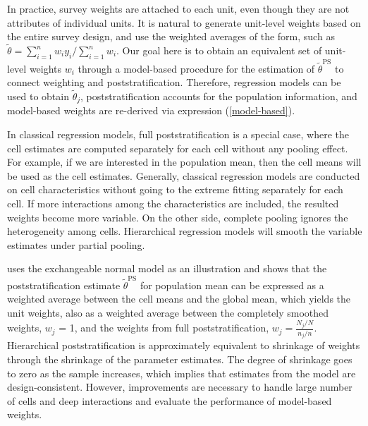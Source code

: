 \documentclass[11pt]{article}
\begin{document}
In practice, survey weights are attached to each unit, even though they are not attributes of individual units. It is natural to generate unit-level weights based on the entire survey design, and use the weighted averages of the form, such as $\tilde{\theta}=\sum_{i=1}^n w_i y_i/\sum_{i=1}^nw_i$. Our goal here is to obtain an equivalent set of unit-level weights $w_i$ through a model-based procedure for the estimation of $\tilde{\theta}^{\textrm{PS}}$ to connect weighting and poststratification. Therefore, regression models can be used to obtain $\tilde{\theta}_j$, poststratification accounts for the population information, and model-based weights are re-derived via expression (\ref{model-based}).
	
In classical regression models, full poststratification is a special case, where the cell estimates are computed separately for each cell without any pooling effect. For example, if we are interested in the population mean, then the cell means will be used as the cell estimates. Generally, classical regression models are conducted on cell characteristics without going to the extreme fitting separately for each cell. If more interactions among the characteristics are included, the resulted weights become more variable. On the other side, complete pooling ignores the heterogeneity among cells. Hierarchical regression models will smooth the variable estimates under partial pooling. 
	
\cite{gelman07} uses the exchangeable normal model as an illustration and shows that the poststratification estimate $\tilde{\theta}^{\textrm{PS}}$ for population mean can be expressed as a weighted average between the cell means and the global mean, which yields the unit weights, also as a weighted average between the completely smoothed weights, $w_j$ = 1, and the weights from full poststratification, $w_j = \frac{N_j/N}{n_j /n}$. Hierarchical poststratification is approximately equivalent to shrinkage of weights through the shrinkage of the parameter estimates. The degree of shrinkage goes to zero as the sample increases, which implies that estimates from the model are design-consistent. However, improvements are necessary to handle large number of cells and deep interactions and evaluate the performance of model-based weights. 
\end{document}
